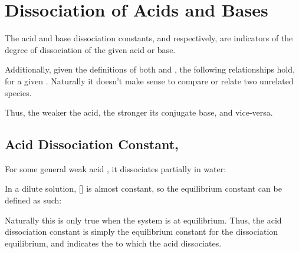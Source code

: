 



	\pagebreak
	\section{Dissociation of Acids and Bases}

		The acid and base dissociation constants, \Ka{} and \Kb{} respectively, are indicators of the degree of dissociation of the given acid
		or base.

		Additionally, given the definitions of both \Ka{} and \Kb{}, the following relationships hold, for a given
		. Naturally it doesn't make sense to compare or relate two unrelated species.


		Thus, the weaker the acid, the stronger its conjugate base, and vice-versa.


		\subsection{Acid Dissociation Constant, \MKa{}}

			For some general weak acid , it dissociates partially in water:


			In a dilute solution, [] is almost constant, so the equilibrium constant can be defined as such:


			Naturally this is only true when the system is at equilibrium. Thus, the acid dissociation constant \Ka{} is simply the
			equilibrium constant for the dissociation equilibrium, and indicates the  to which the acid dissociates.


